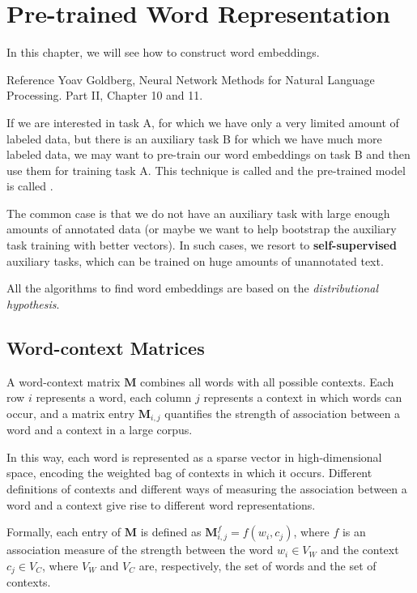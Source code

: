 \chapter{Pre-trained Word Representation}

In this chapter, we will see how to construct word embeddings.

\begin{note}{Reference}
    Yoav Goldberg, Neural Network Methods for Natural Language Processing.\cite{goldberg2017neural}
    Part II, Chapter 10 and 11.
\end{note}
If we are interested in task A, for which we have only a very limited amount of labeled data, but there is an auxiliary task B for which we have much more labeled data, we may want to pre-train our word embeddings on task B and then use them for training task A.
This technique is called  and the pre-trained model is called .

The common case is that we do not have an auxiliary task with large enough amounts of annotated data (or maybe we want to help bootstrap the auxiliary task training with better vectors). In such cases, we resort to \textbf{self-supervised} auxiliary tasks, which can be trained on huge amounts of unannotated text.

All the algorithms to find word embeddings are based on the \textit{distributional hypothesis}.

\section{Word-context Matrices}
A word-context matrix $\mathbf{M}$ combines all words with all possible contexts. Each row $i$ represents a word, each column $j$ represents a context in which words can occur, and a matrix entry $\mathbf{M}_{i,j}$ quantifies the strength of association between a word and a context in a large corpus.

In this way, each word is represented as a sparse vector in high-dimensional space, encoding the weighted bag of contexts in which it occurs. Different definitions of contexts and different ways of measuring the association between a word and a context give rise to different word representations.

Formally, each entry of $\mathbf{M}$ is defined as $\mathbf{M}_{i,j}^{f}=f(w_{i},c_{j})$, where $f$ is an association measure of the strength between the word $w_{i}\in V_{W}$ and the context $c_{j} \in V_{C}$, where $V_{W}$ and $V_{C}$ are, respectively, the set of words and the set of contexts.

